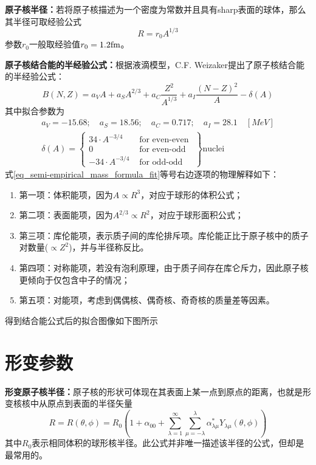 \textbf{原子核半径：}若将原子核描述为一个密度为常数并且具有sharp表面的球体，那么其半径可取经验公式
\begin{equation}
	R = r_0 A^{1/3}	\label{eq_nuclear_radius}
\end{equation} 
参数$r_0$一般取经验值$r_0 = 1.2 {\rm fm}$。

\textbf{原子核结合能的半经验公式：}根据液滴模型，C.F. Weizaker提出了原子核结合能的半经验公式：
\begin{equation}
	B(N, Z) = a_V A + a_S A^{2/3} + a_C \frac{Z^2}{A^{1/3}} + a_I \frac{(N-Z)^2}{A} - \delta(A)	\label{eq_semi-empirical_mass_formula}
\end{equation} 
其中拟合参数为
\begin{equation}
    \begin{aligned}
		a_V = -15.68; \quad a_S = 18.56; \quad a_C = 0.717; \quad a_I = 28.1	\quad	[MeV]	\\
		\delta(A) = \left\{ \begin{array}{cc}
				34 \cdot A^{-3/4} & \text{ for even-even } \\
				0 & \text{ for even-odd }	\\
				-34 \cdot A^{-3/4} & \text{ for odd-odd }
		\end{array}\right\} \text{nuclei}
    \end{aligned}
    	\label{eq_semi-empirical_mass_formula_fit}
\end{equation} 
式\eqref{eq_semi-empirical_mass_formula_fit}等号右边逐项的物理解释如下：
\begin{enumerate}
	\item 第一项：体积能项，因为$ A \propto R^3$，对应于球形的体积公式；
	\item 第二项：表面能项，因为$ A^{2/3} \propto R^2$，对应于球形面积公式；
	\item 第三项：库伦能项，表示质子间的库伦排斥项。库伦能正比于原子核中的质子对数量($\propto Z^2$)，并与半径称反比。
	\item 第四项：对称能项，若没有泡利原理，由于质子间存在库仑斥力，因此原子核更倾向于仅包含中子的情况；
	\item 第五项：对能项，考虑到偶偶核、偶奇核、奇奇核的质量差等因素。
\end{enumerate}
得到结合能公式后的拟合图像如下图所示


\section{形变参数}
\textbf{形变原子核半径：}原子核的形状可体现在其表面上某一点到原点的距离，也就是形变核核中从原点到表面的半径矢量
\begin{equation}
	R = R(\theta, \phi) = R_0 ( 1 + \alpha_{00} + \sum_{\lambda = 1}^{\infty} \sum_{\mu = -\lambda}^{\lambda}\alpha^{*}_{\lambda\mu} Y_{\lambda\mu}(\theta, \phi) )	\label{eq_deform_radius}
\end{equation} 
其中$R_0$表示相同体积的球形核半径。此公式并非唯一描述该半径的公式，但却是最常用的。






